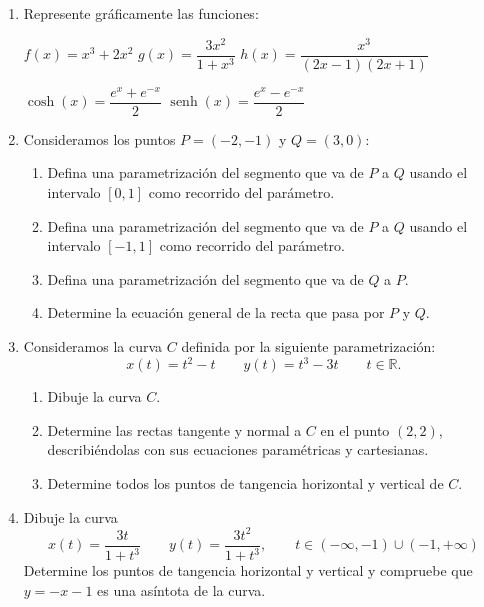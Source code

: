 \begin{enumerate}

\item
Represente gráficamente las funciones:
\setcontadoralph
\begin{centrar}
\nitem
$f(x)=x^3+2x^2$\hfill
\nitem
$g(x)=\dfrac{3x^2}{1+x^3}$\hfill
\nitem
$h(x)=\dfrac{x^3}{(2x-1)(2x+1)}$
\end{centrar}
\begin{centrar}
\nitem
$\cosh(x)=\dfrac{e^x+e^{-x}}2$\hfill
\nitem
$\operatorname{senh}(x)=\dfrac{e^x-e^{-x}}2$
\end{centrar}


\item
Consideramos los puntos $P=(-2,-1)$ y $Q=(3,0)$:
\begin{enumerate}
\item
Defina una parametrización del segmento que va de $P$ a $Q$ usando el intervalo $[0,1]$ como recorrido del parámetro.

\item
Defina una parametrización del segmento que va de $P$ a $Q$ usando el intervalo $[-1,1]$ como recorrido del parámetro.

\item
Defina una parametrización del segmento que va de $Q$ a $P$.

\item
Determine la ecuación general de la recta que pasa por $P$ y $Q$.
\end{enumerate}

\item
Consideramos la curva $C$ definida por la siguiente parametrización:
\[
x(t)=t^2-t\qquad y(t)=t^3-3t\qquad t\in \mathbb{R}.
\]
\begin{enumerate}
\item
Dibuje la curva $C$.

\item
Determine las rectas tangente y normal a $C$ en el punto $(2,2)$,%
describiéndolas con sus ecuaciones paramétricas y cartesianas.

\item
Determine todos los puntos de tangencia horizontal y vertical de $C$.
\end{enumerate}

\item
Dibuje la curva
\[
x(t)=\dfrac{3t}{1+t^3}\qquad y(t)=\dfrac{3t^2}{1+t^3},\qquad t\in (-\infty,-1)\cup(-1,+\infty)
\]
Determine los puntos de tangencia horizontal y vertical y compruebe que $y=-x-1$ es una asíntota de la curva.



\end{enumerate}
